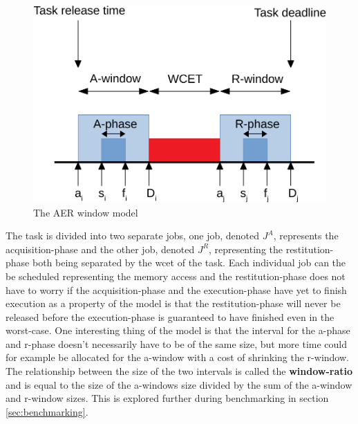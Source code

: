 \documentclass{kththesis}
\begin{document}
\begin{figure}

    \centering

    \includegraphics[width=0.8\linewidth]{images/aer_window_model.pdf}

    \caption{The AER window model}

    \label{fig:aer_window_model}

\end{figure}


The task is divided into two separate jobs, one job, denoted $J^{A}$, represents the
acquisition-phase and the other job, denoted $J^{R}$, representing the restitution-phase both being
separated by the \acrshort{wcet} of the task. Each individual job can the be scheduled representing
the memory access and the restitution-phase does not have to worry if the acquisition-phase and the
execution-phase have yet to finish execution as a property of the model is that the
restitution-phase will never be released before the execution-phase is guaranteed to have finished
even in the worst-case. One interesting thing of the model is that the interval for the
\acrshort{a}-phase and \acrshort{r}-phase doesn't necessarily have to be of the same size, but more
time could for example be allocated for the \acrshort{a}-window with a cost of shrinking the
\acrshort{r}-window. The relationship between the size of the two intervals is called the
\textbf{window-ratio} and is equal to the size of the \acrshort{a}-windows size divided by the
sum of the \acrshort{a}-window and \acrshort{r}-window sizes. This is explored further during
benchmarking in section \ref{sec:benchmarking}.
\end{document}
